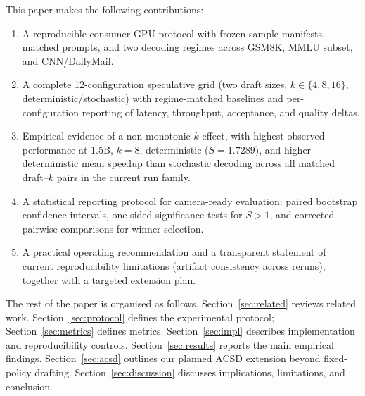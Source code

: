 This paper makes the following contributions:
\begin{enumerate}\itemsep0pt
  \item A reproducible consumer-GPU protocol with frozen sample manifests,
        matched prompts, and two decoding regimes across GSM8K, MMLU subset,
        and CNN/DailyMail.
  \item A complete 12-configuration speculative grid (two draft sizes,
        $k\in\{4,8,16\}$, deterministic/stochastic) with regime-matched
        baselines and per-configuration reporting of latency, throughput,
        acceptance, and quality deltas.
  \item Empirical evidence of a non-monotonic $k$ effect, with highest observed
        performance at 1.5B, $k{=}8$, deterministic ($S{=}1.7289$), and
        higher deterministic mean speedup than stochastic decoding across all
        matched draft--$k$ pairs in the current run family.
  \item A statistical reporting protocol for camera-ready evaluation: paired
        bootstrap confidence intervals, one-sided significance tests for
        $S{>}1$, and corrected pairwise comparisons for winner selection.
  \item A practical operating recommendation and a transparent statement of
        current reproducibility limitations (artifact consistency across reruns),
        together with a targeted extension plan.
\end{enumerate}

The rest of the paper is organised as follows. Section~\ref{sec:related}
reviews related work. Section~\ref{sec:protocol} defines the experimental
protocol; Section~\ref{sec:metrics} defines metrics. Section~\ref{sec:impl}
describes implementation and reproducibility controls. Section~\ref{sec:results}
reports the main empirical findings. Section~\ref{sec:acsd} outlines
our planned ACSD extension beyond fixed-policy drafting. Section~\ref{sec:discussion}
discusses implications, limitations, and conclusion.
